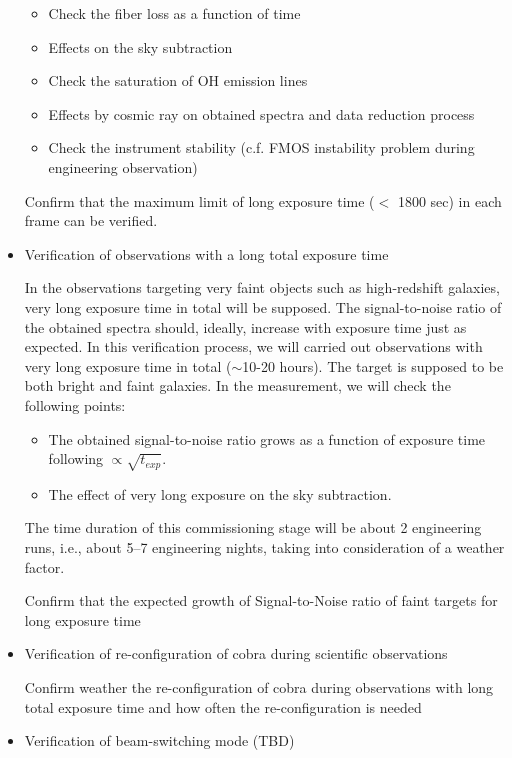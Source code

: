 \begin{itemize}
\begin{itemize}
\item{Check the fiber loss as a function of time}
\item{Effects on the sky subtraction}
\item{Check the saturation of OH emission lines}
\item{Effects by cosmic ray on obtained spectra and data reduction process}
\item{Check the instrument stability (c.f. FMOS instability problem during engineering observation)}
\end{itemize}

\begin{itembox}[l]{}
Confirm that the maximum limit of long exposure time ($<$ 1800 sec) in each frame can be verified.
\end{itembox}

\item{Verification of observations with a long total exposure time}

In the observations targeting very faint objects such as high-redshift galaxies, very long exposure time in total will be supposed. The signal-to-noise ratio of the obtained spectra should, ideally, increase with exposure time just as expected. In this verification process, we will carried out observations with very long exposure time in total ($\sim$10-20 hours). The target is supposed to be both bright and faint galaxies. In the measurement, we will check the following points:

\begin{itemize}
\item{The obtained signal-to-noise ratio grows as a function of exposure time following $\propto \sqrt{t_{exp}}$.} 
\item{The effect of very long exposure on the sky subtraction.}
\end{itemize}

The time duration of this commissioning stage will be about 2 engineering runs, i.e., about 5--7 engineering nights, taking into consideration of a weather factor.

\begin{itembox}[l]{}
Confirm that the expected growth of Signal-to-Noise ratio of faint targets for long exposure time
\end{itembox}

\item{Verification of re-configuration of cobra during scientific observations}

\begin{itembox}[l]{}
Confirm weather the re-configuration of cobra during observations with long total exposure time and how often the re-configuration is needed
\end{itembox}

\item{Verification of beam-switching mode (TBD)}

\end{itemize}
